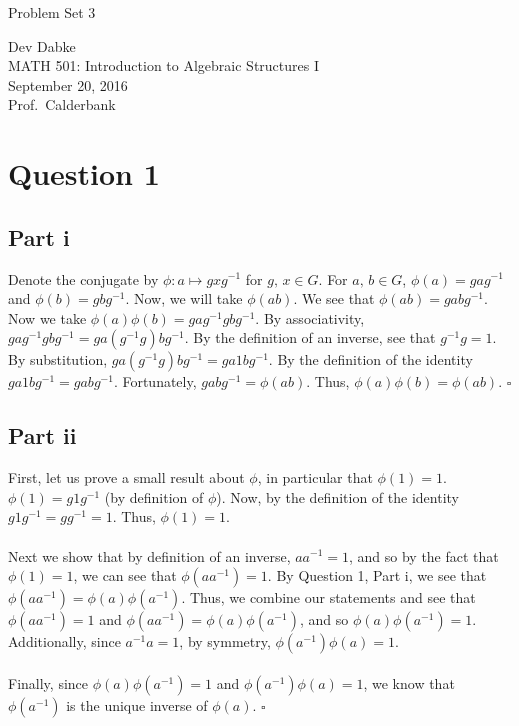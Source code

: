 \documentclass[letterpaper]{article}
\newcommand*{\QED}{\hfill\ensuremath{\square}}%
\def\name{Problem Set 3}
\begin{document}
{\huge \name}


\vspace{0.25in}

Dev Dabke \\
MATH 501: Introduction to Algebraic Structures I \\
September 20, 2016 \\
Prof.\ Calderbank \\

\section{Question 1}
\label{sec:Question1}

\subsection{Part i}
\label{sub:1Parti}
Denote the conjugate by $ \phi : a \mapsto gxg^{-1} $ for $ g,\,x \in G $.
For $ a,\,b \in G $, $ \phi(a) = gag^{-1} $ and $ \phi(b) = gbg^{-1} $.
Now, we will take $ \phi(ab) $.
We see that $ \phi(ab) = gabg^{-1} $.
Now we take $ \phi(a)\phi(b) = gag^{-1}gbg^{-1} $.
By associativity, $ gag^{-1}gbg^{-1} = ga(g^{-1}g)bg^{-1} $.
By the definition of an inverse, see that $ g^{-1}g = 1 $.
By substitution, $ ga(g^{-1}g)bg^{-1} = ga1bg^{-1} $.
By the definition of the identity $ ga1bg^{-1} = gabg^{-1} $.
Fortunately, $ gabg^{-1} = \phi(ab) $.
Thus, $ \phi(a)\phi(b) = \phi(ab) $.
\QED{}

\subsection{Part ii}
\label{sub:1Partii}

First, let us prove a small result about $ \phi $, in particular that $ \phi(1) = 1 $.
$ \phi(1) = g1g^{-1} $ (by definition of $ \phi $).
Now, by the definition of the identity $ g1g^{-1} = gg^{-1} = 1 $.
Thus, $ \phi(1) = 1 $.
\\ \\
Next we show that by definition of an inverse, $ aa^{-1} = 1 $, and so by the fact that $ \phi(1) = 1 $, we can see that $ \phi(aa^{-1}) = 1 $.
By Question 1, Part i, we see that $ \phi(aa^{-1}) = \phi(a)\phi(a^{-1}) $.
Thus, we combine our statements and see that $ \phi(aa^{-1}) = 1 $ and $ \phi(aa^{-1}) = \phi(a)\phi(a^{-1}) $, and so $ \phi(a)\phi(a^{-1}) = 1 $.
Additionally, since $ a^{-1}a = 1 $, by symmetry, $ \phi(a^{-1})\phi(a) = 1 $.
\\ \\
Finally, since $ \phi(a)\phi(a^{-1}) = 1 $ and $ \phi(a^{-1})\phi(a) = 1 $, we know that $ \phi(a^{-1}) $ is the unique inverse of $ \phi(a) $.
\QED{}
\end{document}
